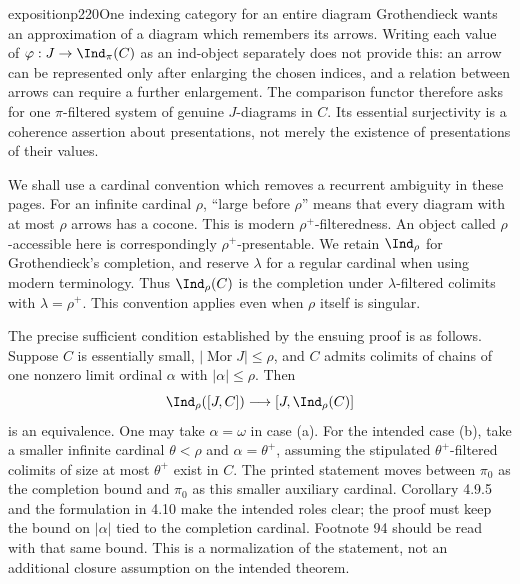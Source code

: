 \begin{dcomment}{exposition}{p220}{One indexing category for an entire diagram}
Grothendieck wants an approximation of a diagram which remembers its arrows.  Writing each value of $\varphi:J\to\Ind_\pi(C)$ as an ind-object separately does not provide this: an arrow can be represented only after enlarging the chosen indices, and a relation between arrows can require a further enlargement.  The comparison functor therefore asks for one $\pi$-filtered system of genuine $J$-diagrams in $C$.  Its essential surjectivity is a coherence assertion about presentations, not merely the existence of presentations of their values.

We shall use a cardinal convention which removes a recurrent ambiguity in these pages.  For an infinite cardinal $\rho$, ``large before $\rho$'' means that every diagram with at most $\rho$ arrows has a cocone.  This is modern $\rho^+$-filteredness.  An object called $\rho$-accessible here is correspondingly $\rho^+$-presentable.  We retain $\Ind_\rho$ for Grothendieck's completion, and reserve $\lambda$ for a regular cardinal when using modern terminology.  Thus $\Ind_\rho(C)$ is the completion under $\lambda$-filtered colimits with $\lambda=\rho^+$.  This convention applies even when $\rho$ itself is singular.

The precise sufficient condition established by the ensuing proof is as follows.  Suppose $C$ is essentially small, $|\operatorname{Mor}J|\leq\rho$, and $C$ admits colimits of chains of one nonzero limit ordinal $\alpha$ with $|\alpha|\leq\rho$.  Then
\[
 \Ind_\rho([J,C])\longrightarrow[J,\Ind_\rho(C)]
\]
is an equivalence.  One may take $\alpha=\omega$ in case (a).  For the intended case (b), take a smaller infinite cardinal $\theta<\rho$ and $\alpha=\theta^+$, assuming the stipulated $\theta^+$-filtered colimits of size at most $\theta^+$ exist in $C$.  The printed statement moves between $\pi_0$ as the completion bound and $\pi_0$ as this smaller auxiliary cardinal.  Corollary 4.9.5 and the formulation in 4.10 make the intended roles clear; the proof must keep the bound on $|\alpha|$ tied to the completion cardinal.  Footnote 94 should be read with that same bound.  This is a normalization of the statement, not an additional closure assumption on the intended theorem.


\end{dcomment}
